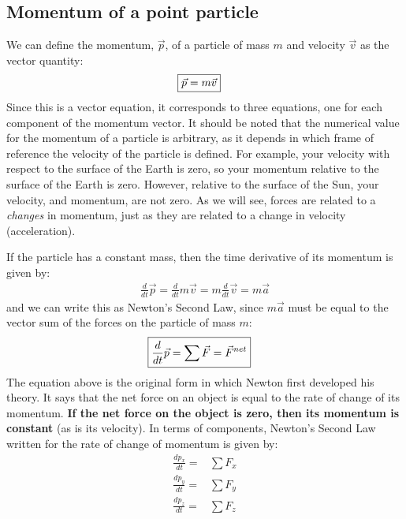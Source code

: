 \subsection{Momentum of a point particle}
We can define the momentum, $\vec p$, of a particle of mass $m$ and velocity $\vec v$ as the vector quantity:
\begin{align}
\Aboxed{\vec p = m\vec v}
\end{align}
Since this is a vector equation, it corresponds to three equations, one for each component of the momentum vector. It should be noted that the numerical value for the momentum of a particle is arbitrary, as it depends in which frame of reference the velocity of the particle is defined. For example, your velocity with respect to the surface of the Earth is zero, so your momentum relative to the surface of the Earth is zero. However, relative to the surface of the Sun, your velocity, and momentum, are not zero. As we will see, forces are related to a \textit{changes} in momentum, just as they are related to a change in velocity (acceleration). 

If the particle has a constant mass, then the time derivative of its momentum is given by:
\begin{align*}
\frac{d}{dt}\vec p = \frac{d}{dt}m\vec v = m\frac{d}{dt}\vec v=m\vec a
\end{align*}
and we can write this as Newton's Second Law, since $m\vec a$ must be equal to the vector sum of the forces on the particle of mass $m$:
\begin{align}
\Aboxed{\frac{d}{dt}\vec p = \sum \vec F = \vec F^{net}}
\end{align}
The equation above is the original form in which Newton first developed his theory. It says that the net force on an object is equal to the rate of change of its momentum. \textbf{If the net force on the object is zero, then its momentum is constant} (as is its velocity). In terms of components, Newton's Second Law written for the rate of change of momentum is given by:
\begin{align*}
\frac{dp_x}{dt} =& \sum F_x\\
\frac{dp_y}{dt} =& \sum F_y\\
\frac{dp_z}{dt} =& \sum F_z
\end{align*}

